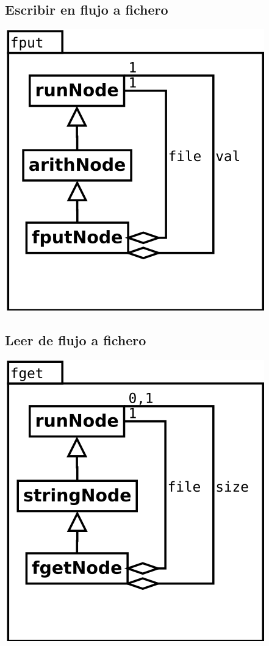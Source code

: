 \subsection {Escribir en flujo a fichero} 
\begin{center}
\includegraphics[scale=0.4]{fput.png} \\
\end{center}

\subsection {Leer de flujo a fichero} 
\begin{center}
\includegraphics[scale=0.4]{fget.png} \\
\end{center}

